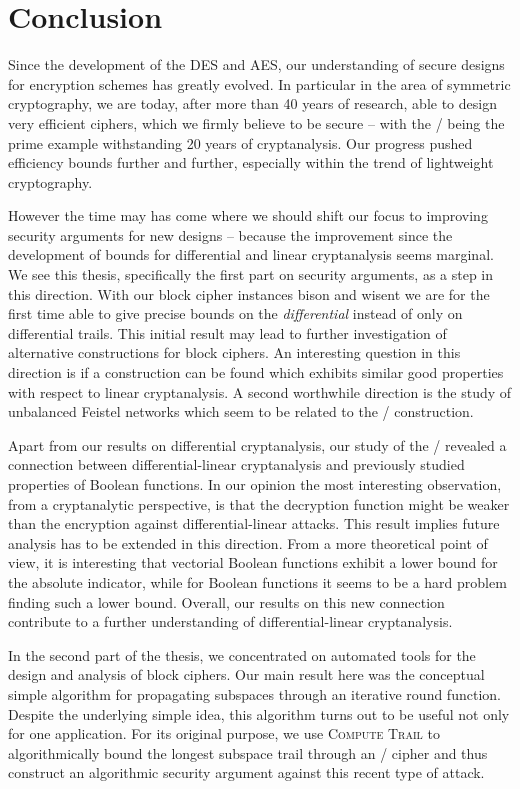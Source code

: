 \chapter{Conclusion}\label{ch:conclusion}
Since the development of the DES and AES, our understanding of secure designs for encryption schemes has greatly evolved.
In particular in the area of symmetric cryptography, we are today, after more than 40 years of research, able to design very efficient ciphers, which we firmly believe to be secure -- with the \AES/ being the prime example withstanding 20 years of cryptanalysis.
Our progress pushed efficiency bounds further and further, especially within the trend of lightweight cryptography.

However the time may has come where we should shift our focus to improving security arguments for new designs -- because the improvement since the development of bounds for differential and linear cryptanalysis seems marginal.
We see this thesis, specifically the first part on security arguments, as a step in this direction.
With our block cipher instances bison and wisent we are for the first time able to give precise bounds on the \emph{differential} instead of only on differential trails.
This initial result may lead to further investigation of alternative constructions for block ciphers.
An interesting question in this direction is if a construction can be found which exhibits similar good properties with respect to linear cryptanalysis.
A second worthwhile direction is the study of unbalanced Feistel networks which seem to be related to the \WSN/ construction.

Apart from our results on differential cryptanalysis, our study of the \ACT/ revealed a connection between differential-linear cryptanalysis and previously studied properties of Boolean functions.
In our opinion the most interesting observation, from a cryptanalytic perspective, is that the decryption function might be weaker than the encryption against differential-linear attacks.
This result implies future analysis has to be extended in this direction.
From a more theoretical point of view, it is interesting that vectorial Boolean functions exhibit a lower bound for the absolute indicator, while for Boolean functions it seems to be a hard problem finding such a lower bound.
Overall, our results on this new connection contribute to a further understanding of differential-linear cryptanalysis.

In the second part of the thesis, we concentrated on automated tools for the design and analysis of block ciphers.
Our main result here was the conceptual simple algorithm for propagating subspaces through an iterative round function.
Despite the underlying simple idea, this algorithm turns out to be useful not only for one application.
For its original purpose, we use \textsc{Compute Trail} to algorithmically bound the longest subspace trail through an \SPN/ cipher and thus construct an algorithmic security argument against this recent type of attack.

